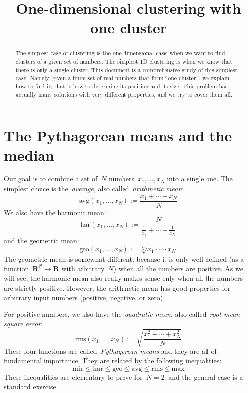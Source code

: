 \title{One-dimensional clustering with one cluster}

\begin{abstract}
	The simplest case of clustering is the one dimensional case:
	when we want to find clusters of a given set of numbers.  The
	simplest 1D clustering is when we know that there is only a
	single cluster.  This document is a comprehensive study of
	this simplest case.  Namely, given a finite set of real
	numbers that form ``one cluster'', we explain how to find it;
	that is how to determine its position and its size.  This
	problem has actually many solutions with very different
	properties, and we try to cover them all.
\end{abstract}

\newcommand{\R}{\mathbf{R}}
\newcommand{\Z}{\mathbf{Z}}

\section{The Pythagorean means and the median}

Our goal is to combine a set of~$N$ numbers~$x_1,\ldots,x_N$ into a
single one.  The simplest choice is the~\emph{average}, also
called~\emph{arithmetic mean}:
\[
	\mathrm{avg}(x_1,\ldots,x_N) := \frac{x_1+\cdots+x_N}{N}
\]
We also have the harmonic mean:
\[
	\mathrm{har}(x_1,\ldots,x_N) :=
	\frac{N}{\frac{1}{x_1}+\cdots+\frac{1}{x_N}}
\]
and the geometric mean:
\[
	\mathrm{geo}(x_1,\ldots,x_N) :=
	\sqrt[N]{x_1\cdot \cdots\cdot x_N}
\]
The geometric mean is somewhat different, because it is only
well-defined (as a function~$\R^N\to\R$ with arbitrary~$N$)
when all the numbers are positive.  As we will see, the harmonic mean
also really makes sense only when all the numbers are strictly positive.
However, the arithmetic mean has good properties for arbitrary input
numbers (positive, negative, or zero).

For positive numbers, we also have the~\emph{quadratic mean}, also
called~\emph{root mean square error}:
\[
	\mathrm{rms}(x_1,\ldots,x_N) :=
	\sqrt{\frac{x_1^2+\cdots+x_N^2}{N}}
\]
These four functions are called~\emph{Pythagorean means} and they are
all of fundamental importance.  They are related by the following
inequalities:
\[
	\mathrm{min}
	\le \mathrm{har}
	\le \mathrm{geo}
	\le \mathrm{avg}
	\le \mathrm{rms}
	\le \mathrm{max}
\]
These inequalities are elementary to prove for~$N=2$, and the general
case is a standard exercise.


